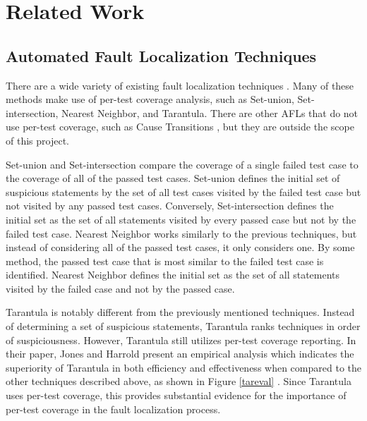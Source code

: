 %
%
\chapter{Related Work}\label{ch:relatedwork}

\section{Automated Fault Localization Techniques}\label{sec:afl}

There are a wide variety of existing fault localization techniques
\cite{harrold}. Many of these methods make use of per-test coverage
analysis, such as Set-union, Set-intersection, Nearest Neighbor, and
Tarantula.  There are other AFLs that do not use per-test coverage, such
as Cause Transitions \cite{cause}, but they are outside the scope of this project.  

Set-union and Set-intersection compare the coverage of a single failed
test case to the coverage of all of the passed test cases.  Set-union
defines the initial set of suspicious statements by the set of all test
cases visited by the failed test case but not visited by any passed test
cases.  Conversely, Set-intersection defines the initial set as the set
of all statements visited by every passed case but not by the failed
test case.  Nearest Neighbor works similarly to the previous techniques,
but instead of considering all of the passed test cases, it only
considers one.  By some method, the passed test case that is most
similar to the failed test case is identified.  Nearest Neighbor defines
the initial set as the set of all statements visited by the failed case
and not by the passed case.

Tarantula is notably different from the previously mentioned techniques.
Instead of determining a set of suspicious statements, Tarantula ranks
techniques in order of suspiciousness.  However, Tarantula still
utilizes per-test coverage reporting.  In their paper, Jones and Harrold
present an empirical analysis which indicates the superiority of
Tarantula in both efficiency and effectiveness when compared to the
other techniques described above, as shown in Figure \ref{tareval} \cite{harrold}.  Since Tarantula
uses per-test coverage, this provides substantial evidence for the
importance of per-test coverage in the fault localization process.

